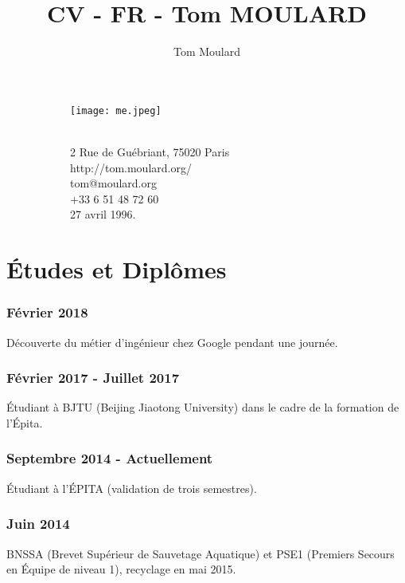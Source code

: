 \documentclass{article}
\begin{document}
    \title{CV - FR - Tom MOULARD}

    \author{Tom Moulard}

    \begin{center}
        \begin{figure}
            \centering
            \begin{subfigure}[b]{0.3\textwidth}
                \texttt{[image: me.jpeg]}
            \end{subfigure}
            \begin{subfigure}[b]{0.3\textwidth}
                {\huge\bfseries\theauthor}\\
                \vspace{.25em}
                2 Rue de Gu\'ebriant, 75020 Paris\\
                http://tom.moulard.org/\\
                tom@moulard.org\\
                +33 6 51 48 72 60\\
                27 avril 1996.
            \end{subfigure}
        \end{figure}
    \end{center}

    \hspace{-.25em}
    \section{\'Etudes et Dipl\^omes}
        \subsubsection{F\'evrier 2018}
            D\'ecouverte du m\'etier d'ing\'enieur chez Google pendant une journ\'ee.
        \subsubsection{F\'evrier 2017 - Juillet 2017}
            \'Etudiant \`a BJTU (Beijing Jiaotong University) dans le cadre de la formation de l'\'Epita.
        \subsubsection{Septembre 2014 - Actuellement}
            \'Etudiant \`a l'\'EPITA (validation de trois semestres).
        \subsubsection{Juin 2014}
            BNSSA (Brevet Sup\'erieur de Sauvetage Aquatique) et PSE1 (Premiers Secours en \'Equipe de niveau 1), recyclage en mai 2015.
\end{document}
